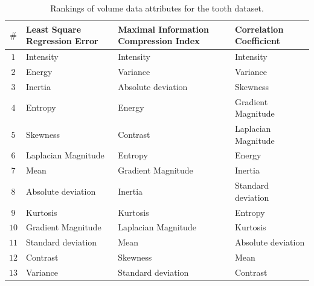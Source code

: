 \begin{table}[htb!]
    \centering
    \caption{Rankings of volume data attributes for the tooth dataset.}
    \label{tab:feature-ranking-for-tooth}
    \begin{tabular}{@{}c>{\centering\arraybackslash}m{}>{\centering\arraybackslash}m{}>{\centering\arraybackslash}m{}@{}}
        \toprule
         \textbf{$\#$} & \textbf{Least Square Regression Error} & \textbf{Maximal Information Compression Index} & \textbf{Correlation Coefficient}\\
        \midrule
        $1$ & Intensity &  Intensity &  Intensity \\
        \hline
        $2$ & Energy &  Variance &  Variance \\
        \hline
        $3$ & Inertia &  Absolute deviation &  Skewness \\
        \hline
        $4$ & Entropy &  Energy &  Gradient Magnitude \\
        \hline
        $5$ & Skewness &  Contrast &  Laplacian Magnitude \\
        \hline
        $6$ & Laplacian Magnitude &  Entropy &  Energy \\
        \hline
        $7$ & Mean &  Gradient Magnitude &  Inertia \\
        \hline
        $8$ & Absolute deviation &  Inertia &  Standard deviation \\
        \hline
        $9$ & Kurtosis &  Kurtosis &  Entropy \\
        \hline
        $10$ & Gradient Magnitude &  Laplacian Magnitude &  Kurtosis \\
        \hline
        $11$ & Standard deviation &  Mean &  Absolute deviation \\
        \hline
        $12$ & Contrast &  Skewness &  Mean \\
        \hline
        $13$ & Variance &  Standard deviation &  Contrast \\
        \bottomrule
    \end{tabular}
\end{table}

